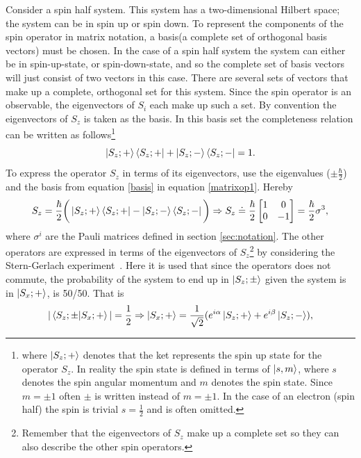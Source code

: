 \begin{example}
	Consider a spin half system. This system has a two-dimensional Hilbert space; the system can be in spin up or spin down. To represent the components of the spin operator in matrix notation, a basis(a complete set of orthogonal basis vectors) must be chosen. In the case of a spin half system the system can either be in spin-up-state, or spin-down-state, and so the complete set of basis vectors will just consist of two vectors in this case. There are several sets of vectors that make up a complete, orthogonal set for this system. Since the spin operator is an observable, the eigenvectors of $S_i$ each make up such a set. By convention the eigenvectors of $S_z$ is taken as the basis. In this basis set the completeness relation can be written as follows\footnote{where $\ket{S_z;+}$ denotes that the ket represents the spin up state for the operator $S_z$. In reality the spin state is defined in terms of $\ket{s,m}$, where $s$ denotes the spin angular momentum and $m$ denotes the spin state. Since $m=\pm1$ often $\pm$ is written instead of $m=\pm1$. In the case of an electron (spin half) the spin is trivial $s=\frac{1}{2}$ and is often omitted.}
	\begin{equation}
		\ket{S_z;+}\bra{S_z;+}+\ket{S_z;-}\bra{S_z;-}=1.
		\label{basis}
	\end{equation} 
	To express the operator $S_z$ in terms of its eigenvectors, use the eigenvalues ($\pm\frac{\hbar}{2}$) and the basis from equation \ref{basis} in equation \ref{matrixop1}. Hereby
	\begin{equation}
		S_z=\frac{\hbar}{2}\bigg(\ket{S_z;+}\bra{S_z;+}-\ket{S_z;-}\bra{S_z;-}\bigg)\Rightarrow S_z\doteq\frac{\hbar}{2} \begin{bmatrix}
			1 & 0\\
			0 & -1 \\
		\end{bmatrix}=\frac{\hbar}{2}\sigma^3,
	\end{equation} 
	where $\sigma^i$ are the Pauli matrices defined in section \ref{sec:notation}. The other operators are expressed in terms of the eigenvectors of $S_z$\footnote{Remember that the eigenvectors of $S_z$ make up a complete set so they can also describe the other spin operators.} by considering  the Stern-Gerlach experiment~\citep[p.26]{Sakurai}. Here it is used that since the operators does not commute, the probability of the system to end up in $\ket{S_z;\pm}$ given the system is in $\ket{S_x;+}$, is 50/50. That is
	\begin{equation}
		|\braket{S_z;\pm|S_x;+}|=\frac{1}{2}\Rightarrow \ket{S_x;+}=\frac{1}{\sqrt{2}}(e^{i\alpha}\ket{S_z;+}+e^{i\beta}\ket{S_z;-}),

\end{equation}
\end{example}
